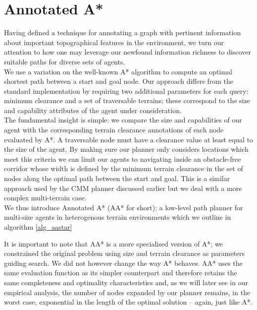 \section{Annotated A*}
\label{aha:aastar}
Having defined a technique for annotating a graph with pertinent information about important topographical features in the environment, we turn our attention to how one may leverage our newfound information richness to discover suitable paths for diverse sets of agents. \\ \newline
We use a variation on the well-known A* algorithm \cite{astar} to compute an optimal shortest path between a start and goal node.  Our approach differs from the standard implementation by requiring two additional parameters for each query: minimum clearance and a set of traversable terrains; these correspond to the size and capability attributes of the agent under consideration. \\ \newline
The fundamental insight is simple: we compare the size and capabilities of our agent with the corresponding terrain clearance annotations of each node evaluated by A*. A traversable node must have a clearance value at least equal to the size of the agent. By making sure our planner only considers locations which meet this criteria we can limit our agents to navigating inside an obstacle-free corridor whose width is defined by the minimum terrain clearance in the set of nodes along the optimal path between the start and goal. This is a similar approach used by the  CMM planner \cite{geraerts07} discussed earlier but we deal with a more complex multi-terrain case. \\ \newline
We thus introduce Annotated A* (AA* for short); a low-level path planner for multi-size agents in heterogenous terrain environments which we outline in algorithm \ref{alg_aastar}

%

It is important to note that AA* is a more specialised version of A*; we constrained the original problem using size and terrain clearance as parameters guiding search. We did not however change the way A* behaves. AA* uses the same evaluation function as its simpler counterpart and therefore retains the same completeness and optimality characteristics and, as we will later see in our empirical analysis, the number of nodes expanded by our planner remains, in the worst case, exponential in the length of the optimal solution -- again, just like A*.
